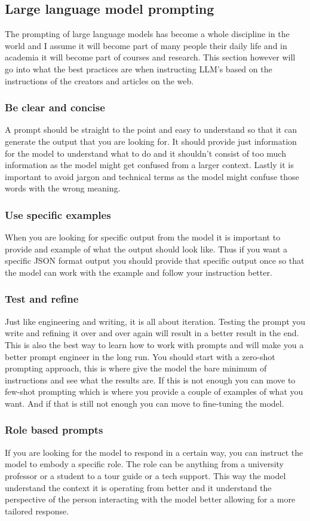 \subsection{Large language model prompting}
The prompting of large language models has become a whole discipline in the world and I assume it will become part of many people their daily life and in academia it will become part of courses and research. This section however will go into what the best practices are when instructing LLM's based on the instructions of the creators and articles on the web.
\subsubsection*{Be clear and concise}
A prompt should be straight to the point and easy to understand so that it can generate the output that you are looking for. It should provide just  information for the model to understand what to do and it shouldn't consist of too much information as the model might get confused from a larger context. Lastly it is important to avoid jargon and technical terms as the model might confuse those words with the wrong meaning.
\subsubsection*{Use specific examples}
When you are looking for specific output from the model it is important to provide and example of what the output should look like. Thus if you want a specific JSON format output you should provide that specific output once so that the model can work with the example and follow your instruction better.
\subsubsection*{Test and refine}
Just like engineering and writing, it is all about iteration. Testing the prompt you write and refining it over and over again will result in a better result in the end. This is also the best way to learn how to work with prompts and will make you a better prompt engineer in the long run. You should start with a zero-shot prompting approach, this is where give the model the bare minimum of instructions and see what the results are. If this is not enough you can move to few-shot  prompting which is where you provide a couple of examples of what you want. And if that is still not enough you can move to fine-tuning the model.
\subsubsection*{Role based prompts}
If you are looking for the model to respond in a certain way, you can instruct the model to embody a specific role. The role can be anything from a university professor or a student to a tour guide or a tech support. This way the model understand the context it is operating from better and it understand the perspective of the person interacting with the model better allowing for a more tailored response. 
